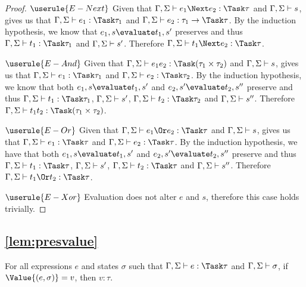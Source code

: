 \begin{proof}
  \case
    {$\userule{E-Next}$}
    {Given that $\Gamma,\Sigma\infers e_1\Next e_2:\Task \tau$ and $\Gamma,\Sigma\vdash s$,  gives us that $\Gamma,\Sigma\infers e_1:\Task\tau_1$ and $\Gamma,\Sigma\infers e_2:\tau_1 \to \Task \tau$.
    By the induction hypothesis, we know that $e_1,s\evaluate t_1,s'$ preserves and thus $\Gamma,\Sigma\infers t_1:\Task\tau_1$ and $\Gamma,\Sigma\vdash s'$.
    Therefore $\Gamma,\Sigma\infers t_1\Next e_2:\Task\tau$.}

  \case
    {$\userule{E-And}$}
    {Given that $\Gamma,\Sigma\infers e_1\And e_2:\Task(\tau_1\times\tau_2)$ and $\Gamma,\Sigma\vdash s$,  gives us that $\Gamma,\Sigma\infers e_1:\Task\tau_1$ and $\Gamma,\Sigma\infers e_2:\Task\tau_2$.
    By the induction hypothesis, we know that both $e_1,s\evaluate t_1,s'$ and $e_2,s'\evaluate t_2,s''$ preserve and thus $\Gamma,\Sigma\infers t_1:\Task\tau_1$, $\Gamma,\Sigma\vdash s'$, $\Gamma,\Sigma\infers t_2:\Task\tau_2$ and $\Gamma,\Sigma\vdash s''$.
    Therefore $\Gamma,\Sigma\infers t_1\And t_2:\Task(\tau_1\times\tau_2)$.}

  \case
    {$\userule{E-Or}$}
    {Given that $\Gamma,\Sigma\infers e_1\Or e_2:\Task\tau$ and $\Gamma,\Sigma\vdash s$,  gives us that $\Gamma,\Sigma\infers e_1:\Task\tau$ and $\Gamma,\Sigma\infers e_2:\Task\tau$.
    By the induction hypothesis, we have that both $e_1,s\evaluate t_1,s'$ and $e_2,s'\evaluate t_2,s''$ preserve and thus $\Gamma,\Sigma\infers t_1:\Task\tau$, $\Gamma,\Sigma\vdash s'$, $\Gamma,\Sigma\infers t_2:\Task\tau$ and $\Gamma,\Sigma\vdash s''$.
    Therefore $\Gamma,\Sigma\infers t_1\Or t_2:\Task\tau$.}

  \case
    {$\userule{E-Xor}$}
    {Evaluation does not alter $e$ and $s$, therefore this case holds trivially.}

\end{proof}



\subsection{\cref{lem:presvalue}}

\begin{lemma}
  For all expressions $e$ and states $\sigma$
  such that $\Gamma,\Sigma \infers e:\Task\tau$ and $\Gamma,\Sigma \vdash \sigma$,
  if $\Value{(e,\sigma)}=v$,
  then $v:\tau$.
  \label{lem:presvalue}
\end{lemma}

